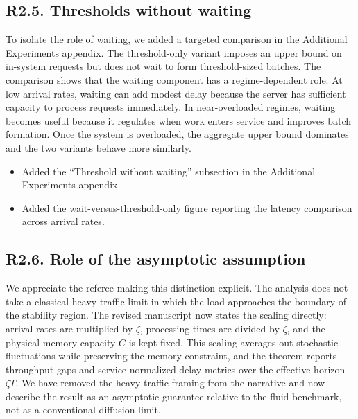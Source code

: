\subsection*{R2.5. Thresholds without waiting}


\response To isolate the role of waiting, we added a targeted comparison in the Additional Experiments appendix. The threshold-only variant imposes an upper bound on in-system requests but does not wait to form threshold-sized batches. The comparison shows that the waiting component has a regime-dependent role. At low arrival rates, waiting can add modest delay because the server has sufficient capacity to process requests immediately. In near-overloaded regimes, waiting becomes useful because it regulates when work enters service and improves batch formation. Once the system is overloaded, the aggregate upper bound dominates and the two variants behave more similarly.

\changes
\begin{itemize}
    \item Added the ``Threshold without waiting'' subsection in the Additional Experiments appendix.
    \item Added the wait-versus-threshold-only figure reporting the latency comparison across arrival rates.
\end{itemize}

\subsection*{R2.6. Role of the asymptotic assumption}


\response We appreciate the referee making this distinction explicit. The analysis does not take a classical heavy-traffic limit in which the load approaches the boundary of the stability region. The revised manuscript now states the scaling directly: arrival rates are multiplied by \(\zeta\), processing times are divided by \(\zeta\), and the physical memory capacity \(C\) is kept fixed. This scaling averages out stochastic fluctuations while preserving the memory constraint, and the theorem reports throughput gaps and service-normalized delay metrics over the effective horizon \(\zeta T\). We have removed the heavy-traffic framing from the narrative and now describe the result as an asymptotic guarantee relative to the fluid benchmark, not as a conventional diffusion limit.

